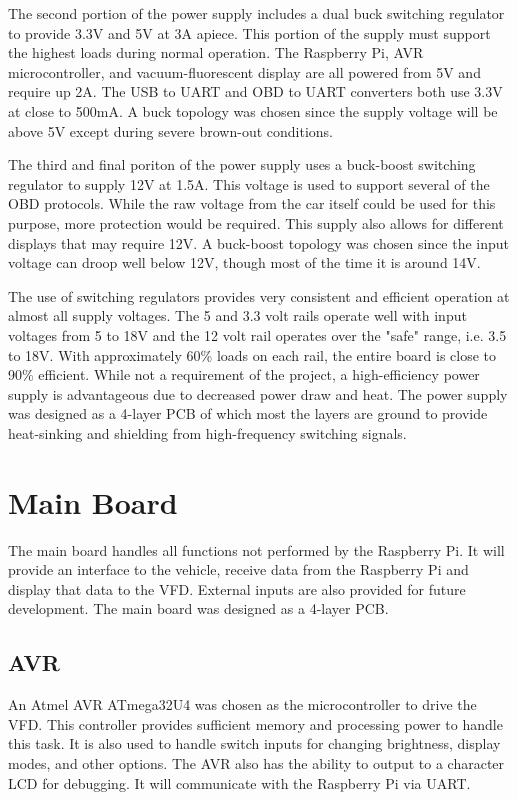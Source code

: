 The second portion of the power supply includes a dual buck switching regulator
to provide 3.3V and 5V at 3A apiece.  This portion of the supply must support 
the highest loads during normal operation.  The Raspberry Pi, AVR 
microcontroller, and vacuum-fluorescent display are all powered from 5V and 
require up 2A.  The USB to UART and OBD to UART converters both use 3.3V at 
close to 500mA.  A buck topology was chosen since the supply voltage will be
above 5V except during severe brown-out conditions.

The third and final poriton of the power supply uses a buck-boost switching
regulator to supply 12V at 1.5A.  This voltage is used to support several
of the OBD protocols.  While the raw voltage from the car itself could be used
for this purpose, more protection would be required.  This supply also allows
for different displays that may require 12V.  A buck-boost topology was chosen
since the input voltage can droop well below 12V, though most of the time it is
around 14V.

The use of switching regulators provides very consistent and efficient operation
at almost all supply voltages.  The 5 and 3.3 volt rails operate well with input
voltages from 5 to 18V and the 12 volt rail operates over the "safe" range, i.e.
3.5 to 18V.  With approximately 60\% loads on each rail, the entire board is close
to 90\% efficient.  While not a requirement of the project, a high-efficiency power
supply is advantageous due to decreased power draw and heat.  The power supply was
designed as a 4-layer PCB of which most the layers are ground to provide 
heat-sinking and shielding from high-frequency switching signals.

\section{Main Board}
The main board handles all functions not performed by the Raspberry Pi.  It will
provide an interface to the vehicle, receive data from the Raspberry Pi and 
display that data to the VFD.  External inputs are also provided for future 
development.  The main board was designed as a 4-layer PCB.

\subsection{AVR}
An Atmel AVR ATmega32U4 was chosen as the microcontroller to drive the VFD.  This
controller provides sufficient memory and processing power to handle this task. 
It is also used to handle switch inputs for changing brightness, display modes,
and other options.  The AVR also has the ability to output to a character LCD
for debugging.  It will communicate with the Raspberry Pi via UART.

